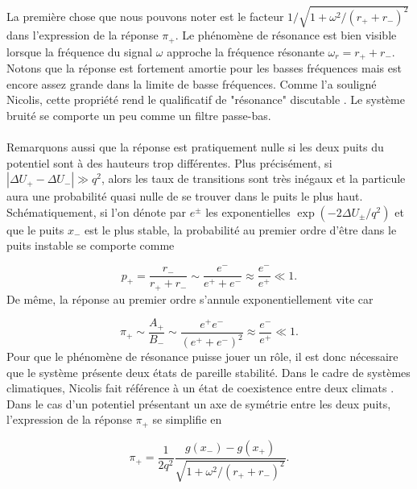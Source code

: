 \paragraph{} La première chose que nous pouvons noter est le facteur $1/\sqrt{1+\omega^2/(r_+ + r_-)^2}$ dans l'expression de la réponse $\pi_+$. Le phénomène de résonance est bien visible lorsque la fréquence du signal $\omega$ approche la fréquence résonante $\omega_r = r_+ + r_-$. Notons que la réponse est fortement amortie pour les basses fréquences mais est encore assez grande dans la limite de basse fréquences. Comme l'a souligné Nicolis, cette propriété rend le qualificatif de "résonance" discutable \cite{nicolis1982}. Le système bruité se comporte un peu comme un filtre passe-bas.

\paragraph{} Remarquons aussi que la réponse est pratiquement nulle si les deux puits du potentiel sont à des hauteurs trop différentes. Plus précisément, si $|\Delta U_+ - \Delta U_-| \gg q^2$, alors les taux de transitions sont très inégaux et la particule aura une probabilité quasi nulle de se trouver dans le puits le plus haut.
Schématiquement, si l'on dénote par $e^\pm$ les exponentielles $\exp(-2\Delta U_\pm/q^2)$ et que le puits $x_-$ est le plus stable, la probabilité au premier ordre d'être dans le puits instable se comporte comme

\begin{equation}
	p_+ = \frac{r_-}{r_+ + r_-} \sim \frac{e^-}{e^+ + e^-} \approx \frac{e^-}{e^+} \ll 1.
\end{equation}
De même, la réponse au premier ordre s'annule exponentiellement vite car

\begin{equation}
	\pi_+ \sim \frac{A_+}{B_-} \sim \frac{e^+e^-}{(e^+ + e^-)^2} \approx \frac{e^-}{e^+} \ll 1.
\end{equation}
Pour que le phénomène de résonance puisse jouer un rôle, il est donc nécessaire que le système présente deux états de pareille stabilité. Dans le cadre de systèmes climatiques, Nicolis fait référence à un état de coexistence entre deux climats \cite{nicolis1981} \cite{nicolis1982}. Dans le cas d'un potentiel présentant un axe de symétrie entre les deux puits, l'expression de la réponse $\pi_+$ se simplifie en

\begin{equation}\label{pi_sans_exp}
	\pi_+ = \frac{1}{2q^2} \frac{g(x_-) - g(x_+)}{\sqrt{1+\omega^2/(r_+ + r_-)^2}}.
\end{equation}






